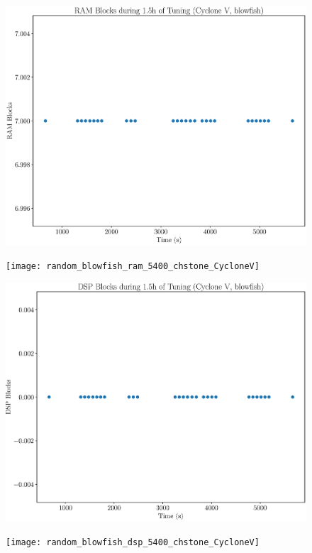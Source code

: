 \documentclass[12pt, a4paper]{article}
\begin{document}
\begin{figure}[htpb]
    \centering
    \noindent
    \begin{minipage}{.48\textwidth}
        \centering
        \includegraphics[scale=.25]{blowfish_ram_5400_chstone_CycloneV}
    \end{minipage}%
    \hfill
    \begin{minipage}{.48\textwidth}
        \centering
        \texttt{[image: random\_blowfish\_ram\_5400\_chstone\_CycloneV]}
    \end{minipage}%

    \begin{minipage}{.48\textwidth}
        \includegraphics[scale=.25]{blowfish_dsp_5400_chstone_CycloneV}
    \end{minipage}%
    \hfill
    \begin{minipage}{.48\textwidth}
        \texttt{[image: random\_blowfish\_dsp\_5400\_chstone\_CycloneV]}
    \end{minipage}%


\end{figure}
\end{document}
